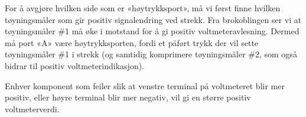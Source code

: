 \vskip 10pt

For å avgjøre hvilken side som er «høytrykksport», må vi først finne hvilken tøyningsmåler som gir positiv signalendring ved strekk. Fra brokoblingen ser vi at tøyningsmåler \#1 må øke i motstand for å gi positiv voltmeteravlesning. Dermed må port «A» være høytrykksporten, fordi et påført trykk der vil sette tøyningsmåler \#1 i strekk (og samtidig komprimere tøyningsmåler \#2, som også bidrar til positiv voltmeterindikasjon).

\vskip 10pt

Enhver komponent som feiler slik at venstre terminal på voltmeteret blir mer positiv, eller høyre terminal blir mer negativ, vil gi en større positiv voltmeterverdi.

